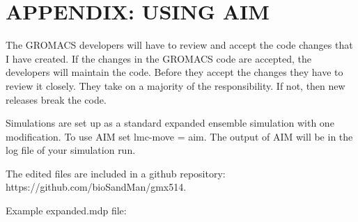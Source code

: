 
\section*{APPENDIX: USING AIM}


The GROMACS developers will have to review and accept the code changes that I have created. If the changes in the GROMACS code are accepted, the developers will maintain the code. Before they accept the changes they have to review it closely. They take on a majority of the responsibility. If not, then new releases break the code.

Simulations are set up as a standard expanded ensemble simulation with one modification. To use AIM set lmc-move = aim. The output of AIM will be in the log file of your simulation run.

The edited files are included in a github repository:\\ https://github.com/bioSandMan/gmx514.

Example expanded.mdp file:

